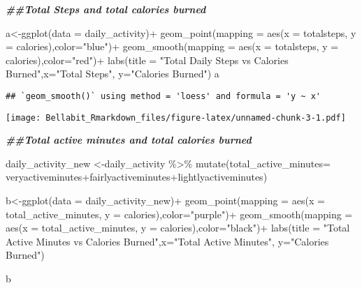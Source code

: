 \documentclass[
]{article}
\newenvironment{Shaded}{\begin{snugshade}}{\end{snugshade}}
\newcommand{\AttributeTok}[1]{\textcolor[rgb]{0.77,0.63,0.00}{#1}}
\newcommand{\DocumentationTok}[1]{\textcolor[rgb]{0.56,0.35,0.01}{\textbf{\textit{#1}}}}
\newcommand{\FunctionTok}[1]{\textcolor[rgb]{0.00,0.00,0.00}{#1}}
\newcommand{\NormalTok}[1]{#1}
\newcommand{\OtherTok}[1]{\textcolor[rgb]{0.56,0.35,0.01}{#1}}
\newcommand{\SpecialCharTok}[1]{\textcolor[rgb]{0.00,0.00,0.00}{#1}}
\newcommand{\StringTok}[1]{\textcolor[rgb]{0.31,0.60,0.02}{#1}}
\begin{document}
\begin{Shaded}
\begin{Highlighting}[]
\DocumentationTok{\#\#Total Steps and total calories burned}

\NormalTok{a}\OtherTok{\textless{}{-}}\FunctionTok{ggplot}\NormalTok{(}\AttributeTok{data =}\NormalTok{ daily\_activity)}\SpecialCharTok{+}
  \FunctionTok{geom\_point}\NormalTok{(}\AttributeTok{mapping =} \FunctionTok{aes}\NormalTok{(}\AttributeTok{x =}\NormalTok{ totalsteps, }\AttributeTok{y =}\NormalTok{ calories),}\AttributeTok{color=}\StringTok{"blue"}\NormalTok{)}\SpecialCharTok{+}
  \FunctionTok{geom\_smooth}\NormalTok{(}\AttributeTok{mapping =} \FunctionTok{aes}\NormalTok{(}\AttributeTok{x =}\NormalTok{ totalsteps, }\AttributeTok{y =}\NormalTok{ calories),}\AttributeTok{color=}\StringTok{"red"}\NormalTok{)}\SpecialCharTok{+}
  \FunctionTok{labs}\NormalTok{(}\AttributeTok{title =} \StringTok{"Total Daily Steps vs Calories Burned"}\NormalTok{,}\AttributeTok{x=}\StringTok{"Total Steps"}\NormalTok{, }\AttributeTok{y=}\StringTok{"Calories Burned"}\NormalTok{)}
\NormalTok{a}
\end{Highlighting}
\end{Shaded}

\begin{verbatim}
## `geom_smooth()` using method = 'loess' and formula = 'y ~ x'
\end{verbatim}

\texttt{[image: Bellabit\_Rmarkdown\_files/figure-latex/unnamed-chunk-3-1.pdf]}

\begin{Shaded}
\begin{Highlighting}[]
\DocumentationTok{\#\#Total active minutes and total calories burned}

\NormalTok{daily\_activity\_new }\OtherTok{\textless{}{-}}\NormalTok{daily\_activity }\SpecialCharTok{\%\textgreater{}\%} 
  \FunctionTok{mutate}\NormalTok{(}\AttributeTok{total\_active\_minutes=}\NormalTok{ veryactiveminutes}\SpecialCharTok{+}\NormalTok{fairlyactiveminutes}\SpecialCharTok{+}\NormalTok{lightlyactiveminutes)}

\NormalTok{b}\OtherTok{\textless{}{-}}\FunctionTok{ggplot}\NormalTok{(}\AttributeTok{data =}\NormalTok{ daily\_activity\_new)}\SpecialCharTok{+}
  \FunctionTok{geom\_point}\NormalTok{(}\AttributeTok{mapping =} \FunctionTok{aes}\NormalTok{(}\AttributeTok{x =}\NormalTok{ total\_active\_minutes, }\AttributeTok{y =}\NormalTok{ calories),}\AttributeTok{color=}\StringTok{"purple"}\NormalTok{)}\SpecialCharTok{+}
  \FunctionTok{geom\_smooth}\NormalTok{(}\AttributeTok{mapping =} \FunctionTok{aes}\NormalTok{(}\AttributeTok{x =}\NormalTok{ total\_active\_minutes, }\AttributeTok{y =}\NormalTok{ calories),}\AttributeTok{color=}\StringTok{"black"}\NormalTok{)}\SpecialCharTok{+}
  \FunctionTok{labs}\NormalTok{(}\AttributeTok{title =} \StringTok{"Total Active Minutes vs Calories Burned"}\NormalTok{,}\AttributeTok{x=}\StringTok{"Total Active Minutes"}\NormalTok{, }\AttributeTok{y=}\StringTok{"Calories Burned"}\NormalTok{)}

\NormalTok{b}
\end{Highlighting}
\end{Shaded}
\end{document}
